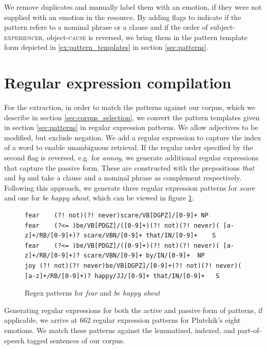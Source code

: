 We remove duplicates and manually label them with an emotion, if they were not supplied with an emotion in the resource. By adding flags to indicate if the pattern refers to a nominal phrase or a clause and if the order of subject-\textsc{experiencer}, object-\textsc{cause} is reversed, we bring them in the pattern template form depicted in \ref{ex:pattern_templates} in section \ref{sec:patterns}.

\section{Regular expression compilation} \label{sec:regex}

For the extraction, in order to match the patterns against our corpus, which we describe in section \ref{sec:corpus_selection}, we convert the pattern templates given in section \ref{sec:patterns} in regular expression patterns. We allow adjectives to be modified, but exclude negation. We add a regular expression to capture the index of a word to enable unambiguous retrieval. If the regular order specified by the second flag is reversed, e.g. for \textit{annoy}, we generate additional regular expressions that capture the passive form. These are constructed with the prepositions \textit{that} and \textit{by} and take a clause and a nominal phrase as complement respectively. Following this approach, we generate three regular expression patterns for \textit{scare} and one for \textit{be happy about}, which can be viewed in figure \ref{fig:patterns}.

\begin{figure}
\begin{lstlisting}
fear	(?! not)(?! never)scare/VB[DGPZ]/[0-9]+	NP
fear	(?<= )be/VB[PDGZ]/([0-9]+)(?! not)(?! never)( [a-z]+/RB/[0-9]+)? scare/VBN/[0-9]+ that/IN/[0-9]+	S
fear	(?<= )be/VB[PDGZ]/([0-9]+)(?! not)(?! never)( [a-z]+/RB/[0-9]+)? scare/VBN/[0-9]+ by/IN/[0-9]+	NP
joy	(?! not)(?! never)be/VB[DGPZ]/[0-9]+(?! not)(?! never)( [a-z]+/RB/[0-9]+)? happy/JJ/[0-9]+ that/IN/[0-9]+	S
\end{lstlisting}
\caption{Regex patterns for \textit{fear} and \textit{be happy about}}\label{fig:patterns}
\end{figure}

Generating regular expressions for both the active and passive form of patterns, if applicable, we arrive at 662 regular expression patterns for Plutchik's eight emotions. We match these patterns against the lemmatized, indexed, and part-of-speech tagged sentences of our corpus.

